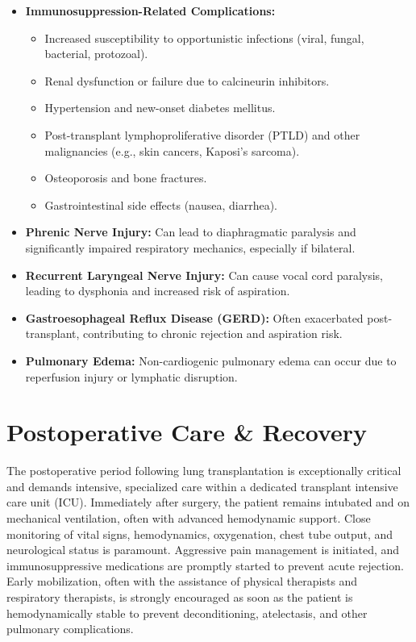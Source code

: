 \begin{itemize}
\begin{itemize}
\begin{itemize}
        \end{itemize}
      \item \textbf{Immunosuppression-Related Complications:}
        \begin{itemize}
          \item Increased susceptibility to opportunistic infections (viral, fungal, bacterial, protozoal).
          \item Renal dysfunction or failure due to calcineurin inhibitors.
          \item Hypertension and new-onset diabetes mellitus.
          \item Post-transplant lymphoproliferative disorder (PTLD) and other malignancies (e.g., skin cancers, Kaposi's sarcoma).
          \item Osteoporosis and bone fractures.
          \item Gastrointestinal side effects (nausea, diarrhea).
        \end{itemize}
      \item \textbf{Phrenic Nerve Injury:} Can lead to diaphragmatic paralysis and significantly impaired respiratory mechanics, especially if bilateral.
      \item \textbf{Recurrent Laryngeal Nerve Injury:} Can cause vocal cord paralysis, leading to dysphonia and increased risk of aspiration.
      \item \textbf{Gastroesophageal Reflux Disease (GERD):} Often exacerbated post-transplant, contributing to chronic rejection and aspiration risk.
      \item \textbf{Pulmonary Edema:} Non-cardiogenic pulmonary edema can occur due to reperfusion injury or lymphatic disruption.
    \end{itemize}
\end{itemize}

\section*{Postoperative Care \& Recovery}
The postoperative period following lung transplantation is exceptionally critical and demands intensive, specialized care within a dedicated transplant intensive care unit (ICU). Immediately after surgery, the patient remains intubated and on mechanical ventilation, often with advanced hemodynamic support. Close monitoring of vital signs, hemodynamics, oxygenation, chest tube output, and neurological status is paramount. Aggressive pain management is initiated, and immunosuppressive medications are promptly started to prevent acute rejection. Early mobilization, often with the assistance of physical therapists and respiratory therapists, is strongly encouraged as soon as the patient is hemodynamically stable to prevent deconditioning, atelectasis, and other pulmonary complications.

